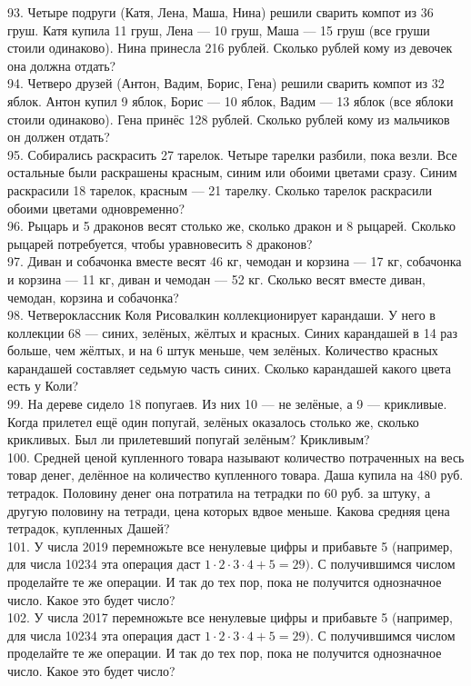 \documentclass[12pt]{article}
\begin{document}
93. Четыре подруги (Катя, Лена, Маша, Нина) решили сварить компот из 36 груш. Катя купила 11 груш, Лена --- 10 груш, Маша --- 15 груш (все груши стоили одинаково). Нина принесла 216 рублей. Сколько рублей кому из девочек она должна отдать?\\
94. Четверо друзей (Антон, Вадим, Борис, Гена) решили сварить компот из 32 яблок. Антон купил 9 яблок, Борис --- 10 яблок, Вадим --- 13 яблок (все яблоки стоили одинаково). Гена принёс 128 рублей. Сколько рублей кому из мальчиков он должен отдать?\\
95. Собирались раскрасить 27 тарелок. Четыре тарелки разбили, пока везли. Все остальные были раскрашены красным, синим или обоими цветами сразу. Синим раскрасили 18 тарелок, красным --- 21 тарелку. Сколько тарелок раскрасили обоими цветами одновременно?\\
96. Рыцарь и 5 драконов весят столько же, сколько дракон и 8 рыцарей. Сколько рыцарей потребуется, чтобы уравновесить 8 драконов?\\
97. Диван и собачонка вместе весят 46 кг, чемодан и корзина --- 17 кг, собачонка и корзина --- 11 кг, диван и чемодан --- 52 кг. Сколько весят вместе диван, чемодан, корзина и собачонка?\\
98. Четвероклассник Коля Рисовалкин коллекционирует карандаши. У него в коллекции 68 --- синих, зелёных, жёлтых и красных. Синих карандашей в 14 раз больше, чем жёлтых, и на 6 штук меньше, чем зелёных. Количество красных карандашей составляет седьмую часть синих. Сколько карандашей какого цвета есть у Коли?\\
99. На дереве сидело 18 попугаев. Из них 10 --- не зелёные, а 9 --- крикливые. Когда прилетел ещё один попугай, зелёных оказалось столько же, сколько крикливых. Был ли прилетевший попугай зелёным? Крикливым?\\
100. Средней ценой купленного товара называют количество потраченных на весь товар денег, делённое на количество купленного товара. Даша купила на 480 руб. тетрадок. Половину денег она потратила на тетрадки по 60 руб. за штуку, а другую половину на тетради, цена которых вдвое меньше. Какова средняя цена тетрадок, купленных Дашей?\\
101. У числа 2019 перемножьте все ненулевые цифры и прибавьте 5 (например, для числа 10234 эта операция даст $1\cdot2\cdot3\cdot4+5=29).$ С получившимся числом проделайте те же операции. И так до тех пор, пока не получится однозначное число. Какое это будет число?\\
102. У числа 2017 перемножьте все ненулевые цифры и прибавьте 5 (например, для числа 10234 эта операция даст $1\cdot2\cdot3\cdot4+5=29).$ С получившимся числом проделайте те же операции. И так до тех пор, пока не получится однозначное число. Какое это будет число?\\
\end{document}
